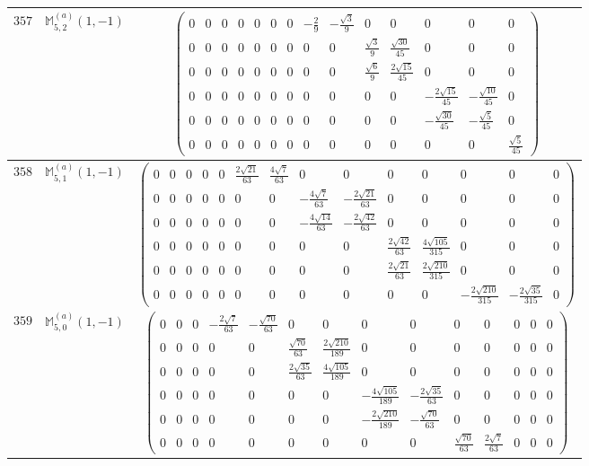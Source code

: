 \documentclass[fleqn,8pt,landscape]{jsarticle}
\begin{document}
\begin{center}
\begin{longtable}{ccc}
$ 357 $ & $ \mathbb{M}_{5,2}^{(a)}(1,-1) $ & $ \begin{pmatrix} 0 & 0 & 0 & 0 & 0 & 0 & 0 & - \frac{2}{9} & - \frac{\sqrt{3}}{9} & 0 & 0 & 0 & 0 & 0 \\ 0 & 0 & 0 & 0 & 0 & 0 & 0 & 0 & 0 & \frac{\sqrt{3}}{9} & \frac{\sqrt{30}}{45} & 0 & 0 & 0 \\ 0 & 0 & 0 & 0 & 0 & 0 & 0 & 0 & 0 & \frac{\sqrt{6}}{9} & \frac{2 \sqrt{15}}{45} & 0 & 0 & 0 \\ 0 & 0 & 0 & 0 & 0 & 0 & 0 & 0 & 0 & 0 & 0 & - \frac{2 \sqrt{15}}{45} & - \frac{\sqrt{10}}{45} & 0 \\ 0 & 0 & 0 & 0 & 0 & 0 & 0 & 0 & 0 & 0 & 0 & - \frac{\sqrt{30}}{45} & - \frac{\sqrt{5}}{45} & 0 \\ 0 & 0 & 0 & 0 & 0 & 0 & 0 & 0 & 0 & 0 & 0 & 0 & 0 & \frac{\sqrt{5}}{45} \end{pmatrix} $ \\ \hline
$ 358 $ & $ \mathbb{M}_{5,1}^{(a)}(1,-1) $ & $ \begin{pmatrix} 0 & 0 & 0 & 0 & 0 & \frac{2 \sqrt{21}}{63} & \frac{4 \sqrt{7}}{63} & 0 & 0 & 0 & 0 & 0 & 0 & 0 \\ 0 & 0 & 0 & 0 & 0 & 0 & 0 & - \frac{4 \sqrt{7}}{63} & - \frac{2 \sqrt{21}}{63} & 0 & 0 & 0 & 0 & 0 \\ 0 & 0 & 0 & 0 & 0 & 0 & 0 & - \frac{4 \sqrt{14}}{63} & - \frac{2 \sqrt{42}}{63} & 0 & 0 & 0 & 0 & 0 \\ 0 & 0 & 0 & 0 & 0 & 0 & 0 & 0 & 0 & \frac{2 \sqrt{42}}{63} & \frac{4 \sqrt{105}}{315} & 0 & 0 & 0 \\ 0 & 0 & 0 & 0 & 0 & 0 & 0 & 0 & 0 & \frac{2 \sqrt{21}}{63} & \frac{2 \sqrt{210}}{315} & 0 & 0 & 0 \\ 0 & 0 & 0 & 0 & 0 & 0 & 0 & 0 & 0 & 0 & 0 & - \frac{2 \sqrt{210}}{315} & - \frac{2 \sqrt{35}}{315} & 0 \end{pmatrix} $ \\ \hline
$ 359 $ & $ \mathbb{M}_{5,0}^{(a)}(1,-1) $ & $ \begin{pmatrix} 0 & 0 & 0 & - \frac{2 \sqrt{7}}{63} & - \frac{\sqrt{70}}{63} & 0 & 0 & 0 & 0 & 0 & 0 & 0 & 0 & 0 \\ 0 & 0 & 0 & 0 & 0 & \frac{\sqrt{70}}{63} & \frac{2 \sqrt{210}}{189} & 0 & 0 & 0 & 0 & 0 & 0 & 0 \\ 0 & 0 & 0 & 0 & 0 & \frac{2 \sqrt{35}}{63} & \frac{4 \sqrt{105}}{189} & 0 & 0 & 0 & 0 & 0 & 0 & 0 \\ 0 & 0 & 0 & 0 & 0 & 0 & 0 & - \frac{4 \sqrt{105}}{189} & - \frac{2 \sqrt{35}}{63} & 0 & 0 & 0 & 0 & 0 \\ 0 & 0 & 0 & 0 & 0 & 0 & 0 & - \frac{2 \sqrt{210}}{189} & - \frac{\sqrt{70}}{63} & 0 & 0 & 0 & 0 & 0 \\ 0 & 0 & 0 & 0 & 0 & 0 & 0 & 0 & 0 & \frac{\sqrt{70}}{63} & \frac{2 \sqrt{7}}{63} & 0 & 0 & 0 \end{pmatrix} $ \\ \hline

\end{longtable}
\end{center}
\end{document}
